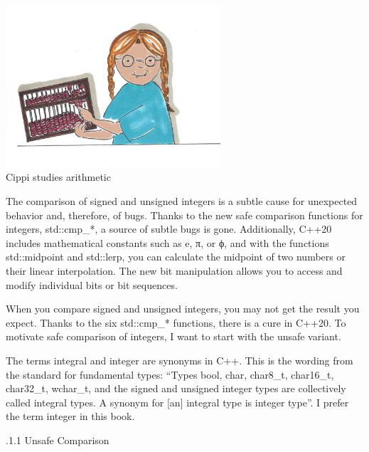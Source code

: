 \begin{center}
\includegraphics[width=0.6\textwidth]{content/3/chapter5/images/15.png}\\
Cippi studies arithmetic
\end{center}

The comparison of signed and unsigned integers is a subtle cause for unexpected behavior and, therefore, of bugs. Thanks to the new safe comparison functions for integers, std::cmp\_*, a source of subtle bugs is gone. Additionally, C++20 includes mathematical constants such as e, π, or ϕ, and with the functions std::midpoint and std::lerp, you can calculate the midpoint of two numbers or their linear interpolation. The new bit manipulation allows you to access and modify individual bits or bit sequences.


When you compare signed and unsigned integers, you may not get the result you expect. Thanks to the six std::cmp\_* functions, there is a cure in C++20. To motivate safe comparison of integers, I want to start with the unsafe variant.

\begin{tcolorbox}[breakable,enhanced jigsaw,colback=blue!5!white,colframe=blue!75!black,title={Integral versus Integer}]
	
The terms integral and integer are synonyms in C++. This is the wording from the standard for fundamental types: “Types bool, char, char8\_t, char16\_t, char32\_t, wchar\_t, and the signed and unsigned integer types are collectively called integral types. A synonym for [an] integral type is integer type”. I prefer the term integer in this book.
	
\end{tcolorbox}

.1.1\hspace{0.2cm} Unsafe Comparison

